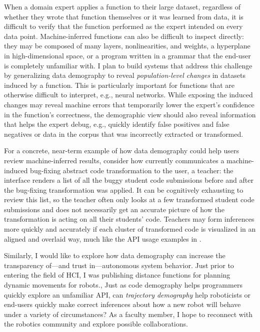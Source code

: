 \documentclass[justified]{tufte-handout}
\begin{document}
When a domain expert applies a function to their large dataset, regardless of whether they wrote that function themselves or it was learned from data, it is difficult to verify that the function performed as the expert intended on every data point. Machine-inferred functions can also be difficult to inspect directly: they may be composed of many layers, nonlinearities, and weights, a hyperplane in high-dimensional space, or a program written in a grammar that the end-user is completely unfamiliar with. I plan to build systems that address this challenge by generalizing data demography to reveal \emph{population-level changes} in datasets induced by a function. This is particularly important for functions that are otherwise difficult to interpret, e.g., neural networks. While exposing the induced changes may reveal machine errors that temporarily lower the expert's confidence in the function's correctness, the demographic view should also reveal information that helps the expert debug, e.g., quickly identify false positives and false negatives or data in the corpus that was incorrectly extracted or transformed.

For a concrete, near-term example of how data demography could help users review machine-inferred results, consider how  currently communicates a machine-induced bug-fixing abstract code transformation to the user, a teacher: the interface renders a list of all the buggy student code submissions before and after the bug-fixing transformation was applied. It can be cognitively exhausting to review this list, so the teacher often only looks at a few transformed student code submissions and does not necessarily get an accurate picture of how the transformation is acting on all their students' code. Teachers may form inferences more quickly and accurately if each cluster of transformed code is visualized in an aligned and overlaid way, much like the API usage examples in .

Similarly, I would like to explore how data demography can increase the transparency of---and trust in---autonomous system behavior.
Just prior to entering the field of HCI, I was publishing distance functions for planning dynamic movements for robots.\cite{lqrrt},\cite{sos} Just as code demography helps programmers quickly explore an unfamiliar API, can \emph{trajectory demography} help roboticists or end-users quickly make correct inferences about how a new robot will behave under a variety of circumstances? As a faculty member, I hope to reconnect with the robotics community and explore possible collaborations. %
\end{document}
